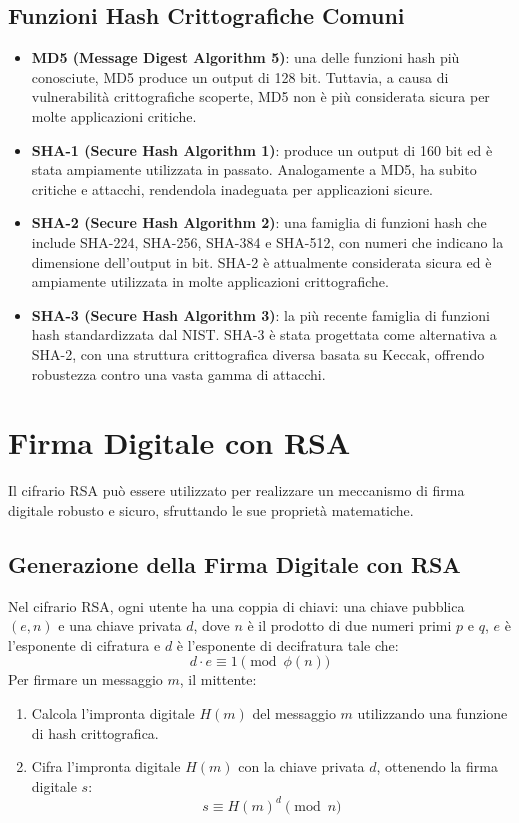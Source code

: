 \documentclass[a4paper,12pt]{report}
\begin{document}
\subsection*{Funzioni Hash Crittografiche Comuni}
\begin{itemize}
    \item \textbf{MD5 (Message Digest Algorithm 5)}: una delle funzioni hash più conosciute, MD5 produce un output di 128 bit. Tuttavia, a causa di vulnerabilità crittografiche scoperte, MD5 non è più considerata sicura per molte applicazioni critiche.
    \item \textbf{SHA-1 (Secure Hash Algorithm 1)}: produce un output di 160 bit ed è stata ampiamente utilizzata in passato. Analogamente a MD5, ha subito critiche e attacchi, rendendola inadeguata per applicazioni sicure.
    \item \textbf{SHA-2 (Secure Hash Algorithm 2)}: una famiglia di funzioni hash che include SHA-224, SHA-256, SHA-384 e SHA-512, con numeri che indicano la dimensione dell'output in bit. SHA-2 è attualmente considerata sicura ed è ampiamente utilizzata in molte applicazioni crittografiche.
    \item \textbf{SHA-3 (Secure Hash Algorithm 3)}: la più recente famiglia di funzioni hash standardizzata dal NIST. SHA-3 è stata progettata come alternativa a SHA-2, con una struttura crittografica diversa basata su Keccak, offrendo robustezza contro una vasta gamma di attacchi.
\end{itemize}

\section{Firma Digitale con RSA}
Il cifrario RSA può essere utilizzato per realizzare un meccanismo di firma digitale robusto e sicuro, sfruttando le sue proprietà matematiche.

\subsection{Generazione della Firma Digitale con RSA}
Nel cifrario RSA, ogni utente ha una coppia di chiavi: una chiave pubblica $(e, n)$ e una chiave privata $d$, dove $n$ è il prodotto di due numeri primi $p$ e $q$, $e$ è l'esponente di cifratura e $d$ è l'esponente di decifratura tale che:
\[d \cdot e \equiv 1 \pmod{\phi(n)}\]
Per firmare un messaggio $m$, il mittente:

\begin{enumerate}
    \item Calcola l'impronta digitale $H(m)$ del messaggio $m$ utilizzando una funzione di hash crittografica.
    \item Cifra l'impronta digitale $H(m)$ con la chiave privata $d$, ottenendo la firma digitale $s$:
    \[ s \equiv H(m)^d \pmod{n}\]
\end{enumerate}
\end{document}
